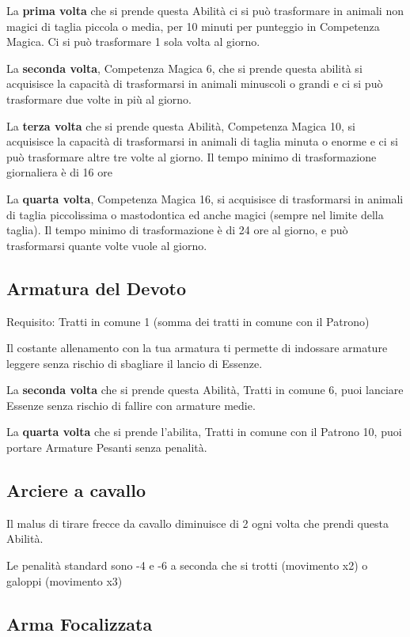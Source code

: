 \documentclass[a4paper,11pt,twoside,openany]{book}
\begin{document}
La \textbf{prima volta} che si prende questa Abilità ci si può trasformare in animali non magici di taglia piccola o media, per 10 minuti per punteggio in Competenza Magica. Ci si può trasformare 1 sola volta al giorno.

La \textbf{seconda volta}, Competenza Magica 6, che si prende questa abilità si acquisisce la capacità di trasformarsi in animali minuscoli o grandi e ci si può trasformare due volte in più al giorno.

La \textbf{terza volta} che si prende questa Abilità, Competenza Magica 10, si acquisisce la capacità di trasformarsi in animali di taglia minuta o enorme e ci si può trasformare altre tre volte al giorno. Il tempo minimo di trasformazione giornaliera è di 16 ore

La \textbf{quarta volta}, Competenza Magica 16, si acquisisce di trasformarsi in animali di taglia piccolissima o mastodontica ed anche magici (sempre nel limite della taglia). Il tempo minimo di trasformazione è di 24 ore al giorno, e può trasformarsi quante volte vuole al giorno.

\subsection{Armatura del Devoto}

Requisito: Tratti in comune 1 (somma dei tratti in comune con il Patrono)

Il costante allenamento con la tua armatura ti permette di indossare armature leggere senza rischio di sbagliare il lancio di Essenze.

La \textbf{seconda volta} che si prende questa Abilità, Tratti in comune 6, puoi lanciare Essenze senza rischio di fallire con armature medie.

La \textbf{quarta volta} che si prende l'abilita, Tratti in comune con il Patrono 10, puoi portare Armature Pesanti senza penalità.

\subsection{Arciere a cavallo}

Il malus di tirare frecce da cavallo diminuisce di 2 ogni volta che prendi questa Abilità.

Le penalità standard sono -4 e -6 a seconda che si trotti (movimento x2) o galoppi (movimento x3)

\subsection{Arma Focalizzata}
\end{document}
